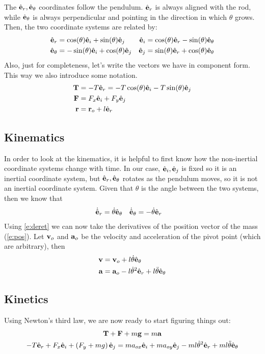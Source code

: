 \documentclass{article}
\begin{document}
The ${\hat{\mathbf{e}}_r,\hat{\mathbf{e}}_\theta}$ coordinates follow the pendulum. $\hat{\mathbf{e}}_r$ is always aligned with the rod, while $\hat{\mathbf{e}}_\theta$ is always perpendicular and pointing in the direction in which $\theta$ grows. Then, the two coordinate systems are related by:
\begin{equation}
\begin{aligned}
  \hat{\mathbf{e}}_r &= \cos(\theta)\hat{\mathbf{e}}_i+\sin(\theta)\hat{\mathbf{e}}_j & \hat{\mathbf{e}}_i &= \cos(\theta)\hat{\mathbf{e}}_r - \sin(\theta)\hat{\mathbf{e}}_\theta \\
  \hat{\mathbf{e}}_\theta &=-\sin(\theta)\hat{\mathbf{e}}_i+\cos(\theta)\hat{\mathbf{e}}_j & \hat{\mathbf{e}}_j &= \sin(\theta)\hat{\mathbf{e}}_r + \cos(\theta)\hat{\mathbf{e}}_\theta
\end{aligned}
\label{e:cs}
\end{equation}
Also, just for completeness, let's write the vectors we have in component form. This way we also introduce some notation.
\begin{align}
  \mathbf{T}&=-T\hat{\mathbf{e}}_r = -T\cos(\theta)\hat{\mathbf{e}}_i-T\sin(\theta)\hat{\mathbf{e}}_j\\
  \mathbf{F}&=F_x\hat{\mathbf{e}}_i+F_y\hat{\mathbf{e}}_j\\
  \mathbf{r}&=\mathbf{r}_{o}+l\hat{\mathbf{e}}_r \label{e:pos}
\end{align}

\subsection{Kinematics}
In order to look at the kinematics, it is helpful to first know how the non-inertial coordinate systems change with time. In our case, ${\hat{\mathbf{e}}_i,\hat{\mathbf{e}}_j}$ is fixed so it is an inertial coordinate system, but ${\hat{\mathbf{e}}_r,\hat{\mathbf{e}}_\theta}$ rotates as the pendulum moves, so it is not an inertial coordinate system. Given that $\theta$ is the angle between the two systems, then we know that
\begin{align}
  \dot{\hat{\mathbf{e}}}_r&=\dot{\theta}\hat{\mathbf{e}}_\theta & \dot{\hat{\mathbf{e}}}_\theta&=-\dot{\theta}\hat{\mathbf{e}}_r
  \label{e:deret}
\end{align}
Using \cref{e:deret} we can now take the derivatives of the position vector of the mass (\cref{e:pos}). Let $\mathbf{v}_{o}$ and $\mathbf{a}_{o}$ be the velocity and acceleration of the pivot point (which are arbitrary), then
\begin{align}
  \mathbf{v}&=\mathbf{v}_{o}+l\dot\theta\hat{\mathbf{e}}_\theta \notag\\
  \mathbf{a}&=\mathbf{a}_{o}-l{\dot\theta}^2\hat{\mathbf{e}}_r+l\ddot\theta\hat{\mathbf{e}}_\theta
\end{align}

\subsection{Kinetics}
Using Newton's third law, we are now ready to start figuring things out:
\begin{gather}
  \mathbf{T}+\mathbf{F}+m\mathbf{g} = m\mathbf{a} \label{e:n3lntsp}\\
  -T\hat{\mathbf{e}}_r+F_x\hat{\mathbf{e}}_i+\left(F_y+mg\right)\hat{\mathbf{e}}_j=ma_{ox}\hat{\mathbf{e}}_i+ma_{oy}\hat{\mathbf{e}}_j-ml{\dot\theta}^2\hat{\mathbf{e}}_r+ml\ddot\theta\hat{\mathbf{e}}_\theta \label{e:n3l}
\end{gather}
\end{document}
